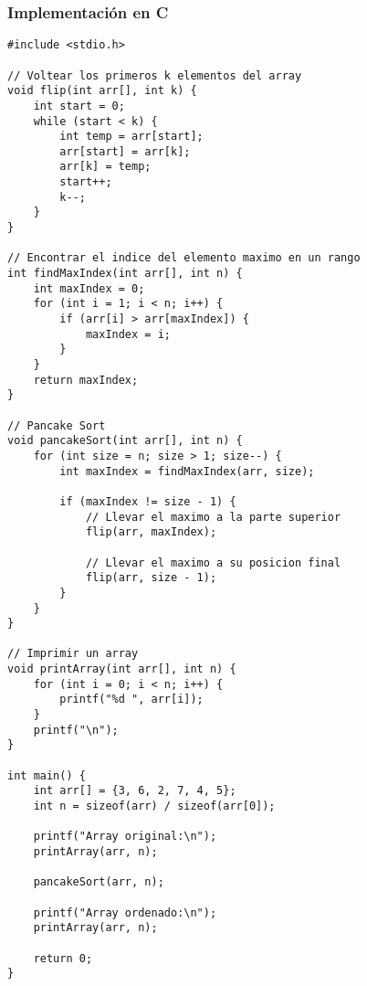 \documentclass[11pt,openany]{book}
\begin{document}
\subsubsection{Implementación en C}
\lstset{language=C}
\begin{lstlisting}
#include <stdio.h>

// Voltear los primeros k elementos del array
void flip(int arr[], int k) {
    int start = 0;
    while (start < k) {
        int temp = arr[start];
        arr[start] = arr[k];
        arr[k] = temp;
        start++;
        k--;
    }
}

// Encontrar el indice del elemento maximo en un rango
int findMaxIndex(int arr[], int n) {
    int maxIndex = 0;
    for (int i = 1; i < n; i++) {
        if (arr[i] > arr[maxIndex]) {
            maxIndex = i;
        }
    }
    return maxIndex;
}

// Pancake Sort
void pancakeSort(int arr[], int n) {
    for (int size = n; size > 1; size--) {
        int maxIndex = findMaxIndex(arr, size);

        if (maxIndex != size - 1) {
            // Llevar el maximo a la parte superior
            flip(arr, maxIndex);

            // Llevar el maximo a su posicion final
            flip(arr, size - 1);
        }
    }
}

// Imprimir un array
void printArray(int arr[], int n) {
    for (int i = 0; i < n; i++) {
        printf("%d ", arr[i]);
    }
    printf("\n");
}

int main() {
    int arr[] = {3, 6, 2, 7, 4, 5};
    int n = sizeof(arr) / sizeof(arr[0]);

    printf("Array original:\n");
    printArray(arr, n);

    pancakeSort(arr, n);

    printf("Array ordenado:\n");
    printArray(arr, n);

    return 0;
}
\end{lstlisting}
\end{document}
